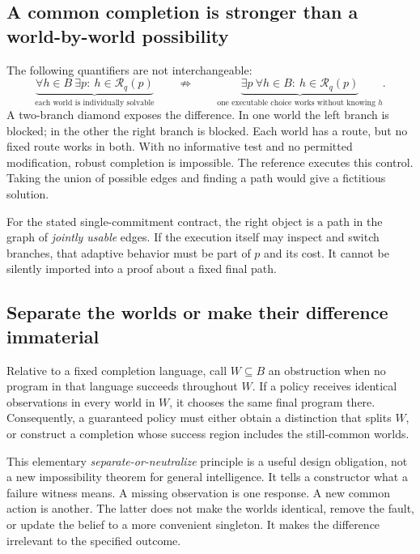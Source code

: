 \documentclass[11pt,letterpaper]{article}
\newcommand{\Req}{\mathcal R}\newcommand{\K}{\mathcal K}
\theoremstyle{remark}\newtheorem{remark}{Remark}[section]
\begin{document}
\subsection{A common completion is stronger than a world-by-world possibility}
The following quantifiers are not interchangeable:
\begin{equation}\label{eq:quantifiers}
\underbrace{\forall h\in B\ \exists p:\ h\in\Req_q(p)}_{\text{each world is individually solvable}}
\qquad\not\Rightarrow\qquad
\underbrace{\exists p\ \forall h\in B:\ h\in\Req_q(p)}_{\text{one executable choice works without knowing }h}.
\end{equation}
A two-branch diamond exposes the difference. In one world the left branch is blocked; in the other the right branch is blocked. Each world has a route, but no fixed route works in both. With no informative test and no permitted modification, robust completion is impossible. The reference executes this control. Taking the union of possible edges and finding a path would give a fictitious solution.

For the stated single-commitment contract, the right object is a path in the graph of \emph{jointly usable} edges. If the execution itself may inspect and switch branches, that adaptive behavior must be part of $p$ and its cost. It cannot be silently imported into a proof about a fixed final path.

\subsection{Separate the worlds or make their difference immaterial}
Relative to a fixed completion language, call $W\subseteq B$ an obstruction when no program in that language succeeds throughout $W$. If a policy receives identical observations in every world in $W$, it chooses the same final program there. Consequently, a guaranteed policy must either obtain a distinction that splits $W$, or construct a completion whose success region includes the still-common worlds.

This elementary \emph{separate-or-neutralize} principle is a useful design obligation, not a new impossibility theorem for general intelligence. It tells a constructor what a failure witness means. A missing observation is one response. A new common action is another. The latter does not make the worlds identical, remove the fault, or update the belief to a more convenient singleton. It makes the difference irrelevant to the specified outcome.
\end{document}
